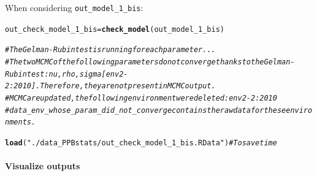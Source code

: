 \documentclass{article}\usepackage[]{graphicx}\usepackage[]{color}
\makeatletter
\newcommand{\hlstr}[1]{\textcolor[rgb]{0.192,0.494,0.8}{#1}}%
\newcommand{\hlcom}[1]{\textcolor[rgb]{0.678,0.584,0.686}{\textit{#1}}}%
\newcommand{\hlstd}[1]{\textcolor[rgb]{0.345,0.345,0.345}{#1}}%
\newcommand{\hlkwb}[1]{\textcolor[rgb]{0.69,0.353,0.396}{#1}}%
\newcommand{\hlkwd}[1]{\textcolor[rgb]{0.737,0.353,0.396}{\textbf{#1}}}%
\newenvironment{kframe}{%
 \def\at@end@of@kframe{}%
 \ifinner\ifhmode%
  \def\at@end@of@kframe{\end{minipage}}%
  \begin{minipage}{\columnwidth}%
 \fi\fi%
 \def\FrameCommand##1{\hskip\@totalleftmargin \hskip-\fboxsep
 \colorbox{shadecolor}{##1}\hskip-\fboxsep
     \hskip-\linewidth \hskip-\@totalleftmargin \hskip\columnwidth}%
 \MakeFramed {\advance\hsize-\width
   \@totalleftmargin\z@ \linewidth\hsize
   \@setminipage}}%
 {\par\unskip\endMakeFramed%
 \at@end@of@kframe}
\newenvironment{knitrout}{}{} %
\makeatother
\begin{document}
When considering \texttt{out\_model\_1\_bis}:
\begin{knitrout}
\color{fgcolor}\begin{kframe}
\begin{alltt}
\hlstd{out_check_model_1_bis} \hlkwb{=} \hlkwd{check_model}\hlstd{(out_model_1_bis)}
\end{alltt}


{\ttfamily\noindent\itshape\color{messagecolor}{\#\# The Gelman-Rubin test is running for each parameter ...}}

{\ttfamily\noindent\itshape\color{messagecolor}{\#\# The two MCMC of the following parameters do not converge thanks to the Gelman-Rubin test : nu, rho, sigma[env2-2:2010]. Therefore, they are not present in MCMC output.}}

{\ttfamily\noindent\itshape\color{messagecolor}{\#\# MCMC are updated, the following environment were deleted : env2-2:2010}}

{\ttfamily\noindent\itshape\color{messagecolor}{\#\# data\_env\_whose\_param\_did\_not\_converge contains the raw data for these environments.}}\begin{alltt}
\hlcom{# The Gelman-Rubin test is running for each parameter ...}
\hlcom{# The two MCMC of the following parameters do not converge thanks to the Gelman-Rubin test : nu, rho, sigma[env2-2:2010]. Therefore, they are not present in MCMC output.}
\hlcom{# MCMC are updated, the following environment were deleted : env2-2:2010}
\hlcom{# data_env_whose_param_did_not_converge contains the raw data for these environments.}

\hlkwd{load}\hlstd{(}\hlstr{"./data_PPBstats/out_check_model_1_bis.RData"}\hlstd{)} \hlcom{# To save time}
\end{alltt}
\end{kframe}
\end{knitrout}


\paragraph{Visualize outputs}
\end{document}
